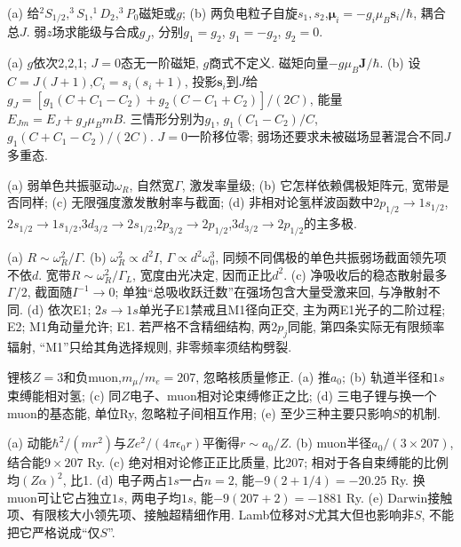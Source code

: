 \begin{exercise}(a) 给$^2S_{1/2},^3S_1,^1D_2,^3P_0$磁矩或$g$; (b) 两负电粒子自旋$s_1,s_2$,$\boldsymbol\mu_i=-g_i\mu_B\mathbf s_i/\hbar$, 耦合总$J$. 弱$z$场求能级与合成$g_J$, 分别$g_1=g_2$, $g_1=-g_2$, $g_2=0$.\end{exercise}
\begin{solution}(a) $g$依次2,2,1; $J=0$态无一阶磁矩, $g$商式不定义. 磁矩向量$-g\mu_B\mathbf J/\hbar$. (b) 设$C=J(J+1)$,$C_i=s_i(s_i+1)$, 投影$\mathbf s_i$到$J$给$g_J=[g_1(C+C_1-C_2)+g_2(C-C_1+C_2)]/(2C)$, 能量$E_{Jm}=E_J+g_J\mu_BmB$. 三情形分别为$g_1$, $g_1(C_1-C_2)/C$, $g_1(C+C_1-C_2)/(2C)$. $J=0$一阶移位零; 弱场还要求未被磁场显著混合不同$J$多重态.
\end{solution}
\begin{exercise}(a) 弱单色共振驱动$\omega_R$, 自然宽$\Gamma$, 激发率量级; (b) 它怎样依赖偶极矩阵元, 宽带是否同样; (c) 无限强度激发散射率与截面; (d) 非相对论氢样波函数中$2p_{1/2}\to1s_{1/2}$,$2s_{1/2}\to1s_{1/2}$,$3d_{3/2}\to2s_{1/2}$,$2p_{3/2}\to2p_{1/2}$,$3d_{3/2}\to2p_{1/2}$的主多极.\end{exercise}
\begin{solution}(a) $R\sim\omega_R^2/\Gamma$. (b) $\omega_R^2\propto d^2I$, $\Gamma\propto d^2\omega_0^3$, 同频不同偶极的单色共振弱场截面领先项不依$d$. 宽带$R\sim\omega_R^2/\Gamma_L$, 宽度由光决定, 因而正比$d^2$. (c) 净吸收后的稳态散射最多$\Gamma/2$, 截面随$I^{-1}\to0$; 单独“总吸收跃迁数”在强场包含大量受激来回, 与净散射不同. (d) 依次E1; $2s\to1s$单光子E1禁戒且M1径向正交, 主为两E1光子的二阶过程; E2; M1角动量允许; E1. 若严格不含精细结构, 两$2p_j$同能, 第四条实际无有限频率辐射, “M1”只给其角选择规则, 非零频率须结构劈裂.
\end{solution}
\begin{exercise}锂核$Z=3$和负muon,$m_\mu/m_e=207$, 忽略核质量修正. (a) 推$a_0$; (b) 轨道半径和$1s$束缚能相对氢; (c) 同$Z$电子、muon相对论束缚修正之比; (d) 三电子锂与换一个muon的基态能, 单位Ry, 忽略粒子间相互作用; (e) 至少三种主要只影响$S$的机制.\end{exercise}
\begin{solution}(a) 动能$\hbar^2/(mr^2)$与$Ze^2/(4\pi\epsilon_0r)$平衡得$r\sim a_0/Z$. (b) muon半径$a_0/(3\times207)$, 结合能$9\times207$ Ry. (c) 绝对相对论修正正比质量, 比207; 相对于各自束缚能的比例均$(Z\alpha)^2$, 比1. (d) 电子两占$1s$一占$n=2$, 能$-9(2+1/4)=-20.25$ Ry. 换muon可让它占独立$1s$, 两电子均$1s$, 能$-9(207+2)=-1881$ Ry. (e) Darwin接触项、有限核大小领先项、接触超精细作用. Lamb位移对$S$尤其大但也影响非$S$, 不能把它严格说成“仅$S$”.
\end{solution}

